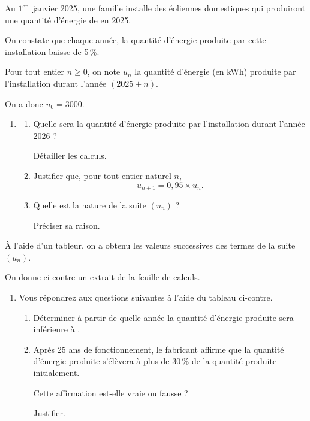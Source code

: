 \begin{minipage}[t]{0.6\linewidth}
	Au $1{ }^{\text {er }}$ janvier 2025, une famille installe des éoliennes domestiques qui produiront une quantité d'énergie de  en 2025.

	On constate que chaque année, la quantité d'énergie produite par cette installation baisse de 5\,\%.

	Pour tout entier $n \geqslant  0$, on note $u_{n}$ la quantité d'énergie (en kWh) produite par l'installation durant l'année $(2025+n)$.

	On a donc $u_{0}=3000$.

	\begin{enumerate}
		\item \begin{enumerate}
			\item Quelle sera la quantité d'énergie produite par l'installation durant l'année 2026 ?

			Détailler les calculs.

			\item Justifier que, pour tout entier naturel $n$,
			\[u_{n+1}=0,95 \times u_{n}.\]

			\item Quelle est la nature de la suite $(u_{n})$ ?

			Préciser sa raison.
		\end{enumerate}
	\end{enumerate}

	À l'aide d'un tableur, on a obtenu les valeurs successives des termes de la suite $(u_{n})$.

	On donne ci-contre un extrait de la feuille de calculs.

	\begin{enumerate}[resume]
		\item Vous répondrez aux questions suivantes à l'aide du tableau ci-contre.

		\begin{enumerate}
			\item Déterminer à partir de quelle année la quantité d'énergie produite sera inférieure à .

			\item Après 25 ans de fonctionnement, le fabricant affirme que la quantité d'énergie produite s'élèvera à plus de $30\,\%$ de la quantité produite initialement.

			Cette affirmation est-elle vraie ou fausse ?

			Justifier.
		\end{enumerate}
	\end{enumerate}
	\end{minipage}
